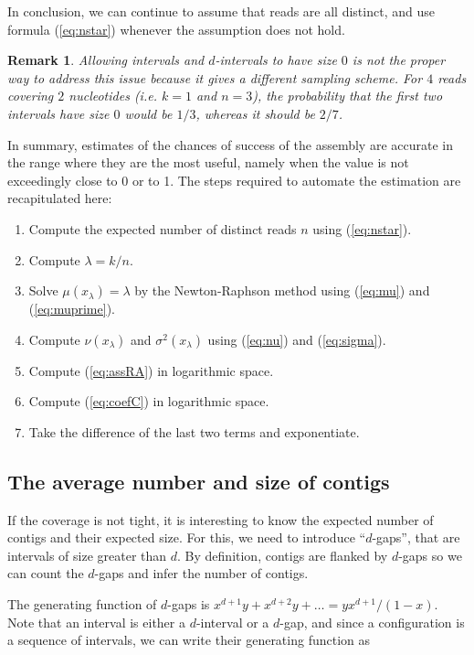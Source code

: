 \documentclass{article}
\newtheorem*{remark}{Remark}
\begin{document}
In conclusion, we can continue to assume that reads are all distinct, and
use formula (\ref{eq:nstar}) whenever the assumption does not hold.

\begin{remark}
Allowing intervals and $d$-intervals to have size $0$ is not the proper
way to address this issue because it gives a different sampling scheme.
For $4$ reads covering $2$ nucleotides (\textit{i.e.} $k=1$ and $n=3$),
the probability that the first two intervals have size $0$ would be $1/3$,
whereas it should be $2/7$.
\end{remark}

In summary, estimates of the chances of success of the assembly are
accurate in the range where they are the most useful, namely when the
value is not exceedingly close to 0 or to 1. The steps required to
automate the estimation are recapitulated here:

\begin{enumerate}
\item Compute the expected number of distinct reads $n$ using
(\ref{eq:nstar}). 
\item Compute $\lambda = k/n$.
\item Solve $\mu(x_\lambda) = \lambda$ by the Newton-Raphson method using
(\ref{eq:mu}) and (\ref{eq:muprime}).
\item Compute $\nu(x_\lambda)$ and $\sigma^2(x_\lambda)$ using
(\ref{eq:nu}) and (\ref{eq:sigma}).
\item Compute (\ref{eq:assRA}) in logarithmic space.
\item Compute (\ref{eq:coefC}) in logarithmic space.
\item Take the difference of the last two terms and exponentiate.
\end{enumerate}

\subsection{The average number and size of contigs}
\label{sec:av}

If the coverage is not tight, it is interesting to know the expected
number of contigs and their expected size. For this, we need to introduce
``$d$-gaps'', that are intervals of size greater than $d$. By definition,
contigs are flanked by $d$-gaps so we can count the $d$-gaps and  infer
the number of contigs.

The generating function of $d$-gaps is $x^{d+1}y + x^{d+2}y + \ldots =
yx^{d+1}/(1-x)$. Note that an interval is either a $d$-interval or a
$d$-gap, and since a configuration is a sequence of intervals, we can
write their generating function as
\end{document}
